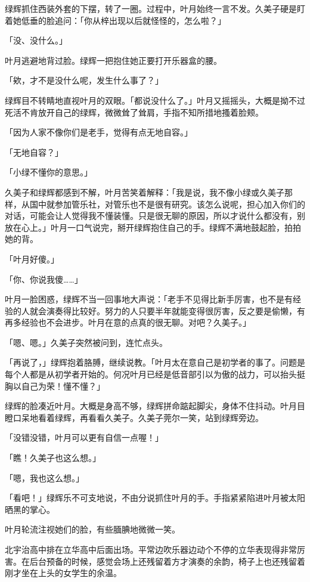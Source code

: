 \documentclass[UTF8]{ctexart}
\begin{document}
    绿辉抓住西装外套的下摆，转了一圈。过程中，叶月始终一言不发。久美子硬是盯着她低垂的脸追问：「你从梓出现以后就怪怪的，怎么啦？」 

    「没、没什么。」 

    叶月逃避地背过脸。绿辉一把抱住她正要打开乐器盒的腰。 

    「欸，才不是没什么呢，发生什么事了？」 

    绿辉目不转睛地直视叶月的双眼。「都说没什么了。」叶月又摇摇头，大概是拗不过死活不肯放开自己的绿辉，微微耸了耸肩，手指不知所措地搔着脸颊。 

    「因为人家不像你们是老手，觉得有点无地自容。」 

    「无地自容？」 

    「小绿不懂你的意思。」 

    久美子和绿辉都感到不解，叶月苦笑着解释：「我是说，我不像小绿或久美子那样，从国中就参加管乐社，对管乐也不是很有研究。该怎么说呢，担心加入你们的对话，可能会让人觉得我不懂装懂。只是很无聊的原因，所以才说什么都没有，别放在心上。」叶月一口气说完，掰开绿辉抱住自己的手。绿辉不满地鼓起脸，拍拍她的背。 

    「叶月好傻。」 

    「你、你说我傻……」 

    叶月一脸困惑，绿辉不当一回事地大声说：「老手不见得比新手厉害，也不是有经验的人就会演奏得比较好。努力的人只要半年就能变得很厉害，反之要是偷懒，有再多经验也不会进步。叶月在意的点真的很无聊。对吧？久美子。」 

    「嗯、嗯。」久美子突然被问到，连忙点头。 

    「再说了，」绿辉抱着胳膊，继续说教。「叶月太在意自己是初学者的事了。问题是每个人都是从初学者开始的。何况叶月已经是低音部引以为傲的战力，可以抬头挺胸以自己为荣！懂不懂？」 

    绿辉的脸凑近叶月。大概是身高不够，绿辉拼命踮起脚尖，身体不住抖动。叶月目瞪口呆地看着绿辉，再看看久美子。久美子莞尔一笑，站到绿辉旁边。 

    「没错没错，叶月可以更有自信一点喔！」 

    「瞧！久美子也这么想。」 

    「嗯，我也这么想。」 

    「看吧！」绿辉乐不可支地说，不由分说抓住叶月的手。手指紧紧陷进叶月被太阳晒黑的掌心。 

    叶月轮流注视她们的脸，有些腼腆地微微一笑。 

    北宇治高中排在立华高中后面出场。平常边吹乐器边动个不停的立华表现得非常厉害。在后台预备的时候，感觉会场上还残留着方才演奏的余韵，椅子上也还残留着刚才坐在上头的女学生的余温。 
\end{document}
